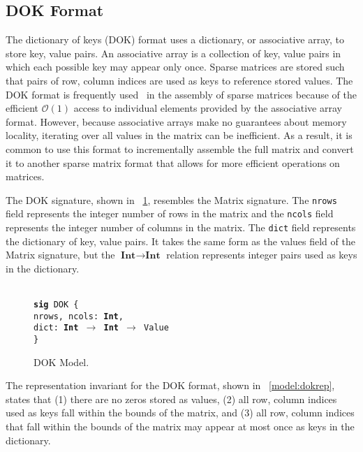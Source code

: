 \documentclass[11pt,conference]{IEEEtran}
\newenvironment{myquote}{\list{}{\leftmargin=12pt\rightmargin=0pt}\item[]}{\endlist}
\def\TA{\makebox[12pt]{}}
\def\Bsig{\textbf{sig} }
\def\Bint{\textbf{Int}}
\begin{document}
\subsection{DOK Format}

The dictionary of keys (DOK) format uses a dictionary, or associative array, to store key, value pairs.  An associative array is a collection of key, value pairs in which each possible key may appear only once.  Sparse matrices are stored such that pairs of row, column indices are used as keys to reference stored values.  The DOK format is frequently used~\cite{scipy, eigenweb2010} in the assembly of sparse matrices because of the efficient \(\mathcal{O}(1)\) access to individual elements provided by the associative array format.  However, because associative arrays make no guarantees about memory locality, iterating over all values in the matrix can be inefficient.  As a result, it is common to use this format to incrementally assemble the full matrix and convert it to another sparse matrix format that allows for more efficient operations on matrices.

The DOK signature, shown in \figurename~\ref{model:dok}, resembles the Matrix signature.  The \texttt{nrows} field represents the integer number of rows in the matrix and the \texttt{ncols} field represents the integer number of columns in the matrix.  The \texttt{dict} field represents the dictionary of key, value pairs.  It takes the same form as the values field of the Matrix signature, but the \(\Bint \to \Bint\) relation represents integer pairs used as keys in the dictionary.

\begin{figure}
\centering
\begin{myquote}\small{\texttt{\\
\Bsig DOK \{\\
\TA nrows, ncols: \Bint,\\
\TA dict: \Bint~$\rightarrow$~\Bint~$\rightarrow$~Value\\
\}
}}
\end{myquote}
\caption{DOK Model.}
\label{model:dok}
\end{figure}

The representation invariant for the DOK format, shown in \figurename~\ref{model:dokrep}, states that (1) there are no zeros stored as values, (2) all row, column indices used as keys fall within the bounds of the matrix, and (3) all row, column indices that fall within the bounds of the matrix may appear at most once as keys in the dictionary.
\end{document}

